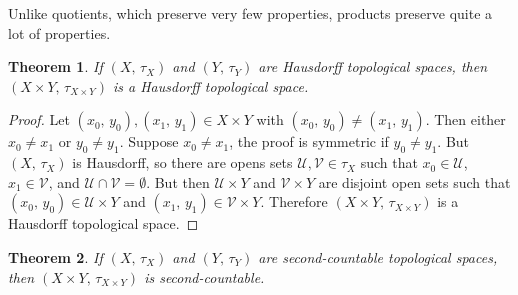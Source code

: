 \documentclass{article}
\theoremstyle{plain}
\newtheorem{theorem}{Theorem}[section]
\theoremstyle{normal}
\begin{document}
        Unlike quotients, which preserve very few properties, products preserve
        quite a lot of properties.
        \begin{theorem}
            If $(X,\,\tau_{X})$ and $(Y,\,\tau_{Y})$ are Hausdorff topological
            spaces, then $(X\times{Y},\,\tau_{X\times{Y}})$ is a Hausdorff
            topological space.
        \end{theorem}
        \begin{proof}
            Let $(x_{0},\,y_{0}),(x_{1},\,y_{1})\in{X}\times{Y}$ with
            $(x_{0},\,y_{0})\ne(x_{1},\,y_{1})$. Then either
            $x_{0}\ne{x}_{1}$ or $y_{0}\ne{y}_{1}$. Suppose
            $x_{0}\ne{x}_{1}$, the proof is symmetric if
            $y_{0}\ne{y}_{1}$. But $(X,\,\tau_{X})$ is Hausdorff, so there are
            opens sets $\mathcal{U},\mathcal{V}\in\tau_{X}$ such that
            $x_{0}\in\mathcal{U}$, $x_{1}\in\mathcal{V}$, and
            $\mathcal{U}\cap\mathcal{V}=\emptyset$. But then
            $\mathcal{U}\times{Y}$ and $\mathcal{V}\times{Y}$ are disjoint open
            sets such that $(x_{0},\,y_{0})\in\mathcal{U}\times{Y}$ and
            $(x_{1},\,y_{1})\in\mathcal{V}\times{Y}$. Therefore
            $(X\times{Y},\,\tau_{X\times{Y}})$ is a Hausdorff topological space.
        \end{proof}
        \begin{theorem}
            If $(X,\,\tau_{X})$ and $(Y,\,\tau_{Y})$ are second-countable
            topological spaces, then $(X\times{Y},\,\tau_{X\times{Y}})$ is
            second-countable.
        \end{theorem}
\end{document}
